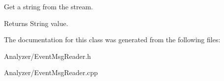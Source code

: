 Get a string from the stream. 

\begin{DoxyReturn}{Returns}
String value. 
\end{DoxyReturn}


The documentation for this class was generated from the following files\-:\begin{DoxyCompactItemize}
\item 
Analyzer/Event\-Msg\-Reader.\-h\item 
Analyzer/Event\-Msg\-Reader.\-cpp\end{DoxyCompactItemize}

